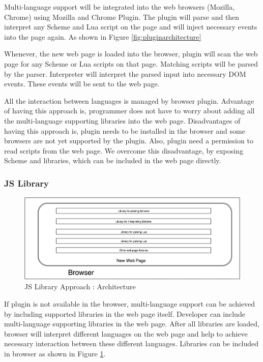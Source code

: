 Multi-language support will be integrated into the web browsers (Mozilla, Chrome) using Mozilla and Chrome Plugin. The plugin will parse and then interpret any Scheme and Lua script on the page and will inject necessary events into the page again. As shown in Figure \ref{fig:pluginarchitecture}

Whenever, the new web page is loaded into the browser, plugin will scan the web page for any Scheme or Lua scripts on that page. Matching scripts will be parsed by the parser. Interpreter will interpret the parsed input into necessary DOM events. These events will be sent to the web page. 

All the interaction between languages is managed by browser plugin. Advantage of having this approach is, programmer does not have to worry about adding all the multi-language supporting libraries into the web page. Disadvantages of having this approach is, plugin needs to be installed in the browser and some browsers are not yet supported by the plugin. Also, plugin need a permission to read scripts from the web page. We overcome this disadvantage, by exposing Scheme and libraries, which can be included in the web page directly.

\subsubsection{JS Library}

\begin{figure}[h]
	\begin{center}
		\includegraphics[width=\linewidth]{./images/JSLibraryApproach.png}
	\end{center}
	\caption{JS Library Approach : Architecture}
	\label{fig:jslibraryarchitecture}
\end{figure}

If plugin is not available in the browser, multi-language support can be achieved by including supported libraries in the web page itself. Developer can include multi-language supporting libraries in the web page. After all libraries are loaded, browser will interpret different languages on the web page and help to achieve necessary interaction between these different languages. Libraries can be included in browser as shown in Figure \ref{fig:jslibraryarchitecture}.
